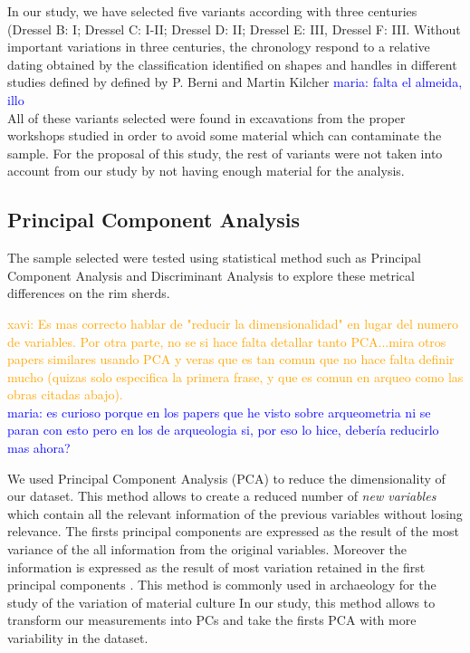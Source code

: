 \documentclass[review]{elsarticle}
\newcommand{\memo}[2]{\textcolor{#1}{#2}}
\newcommand{\xavi}[1]{\memo{orange}{xavi: #1\\}}
\newcommand{\maria}[1]{\memo{blue}{maria: #1\\}}
\begin{document}
In our study, we have selected five variants according with three centuries
(Dressel B: I; Dressel C: I-II; Dressel D: II; Dressel E: III, Dressel F: III. Without important variations in three centuries, the chronology respond to a relative dating obtained by the classification identified on shapes and handles in different studies defined by defined by P. Berni \citep{berni_millet_epigrafianforica_2008} and Martin Kilcher \citep{martin-kilcher_romischen_1994} \maria{falta el almeida, illo}All of these variants selected were found in excavations from the proper workshops studied in order to avoid some material which can contaminate the sample. For the proposal of this study, the rest of variants were not taken into account from our study by not having enough material for the analysis. 


\subsection{Principal Component Analysis}

The sample selected were tested using statistical method such as Principal Component Analysis and Discriminant Analysis to explore these metrical differences on the rim sherds. 

\xavi{Es mas correcto hablar de "reducir la dimensionalidad" en lugar del numero de variables. Por otra parte, no se si hace falta detallar tanto PCA...mira otros papers similares usando PCA y veras que es tan comun que no hace falta definir mucho (quizas solo especifica la primera frase, y que es comun en arqueo como las obras citadas abajo).}
\maria{es curioso porque en los papers que he visto sobre arqueometria ni se paran con esto pero en los de arqueologia si, por eso lo hice, debería reducirlo mas ahora?}

We used Principal Component Analysis (PCA) to reduce the dimensionality of our dataset. This method allows to create a reduced number of \textit{new variables} which contain all the relevant information of the previous variables without losing relevance. The firsts principal components are expressed as the result of the most variance of the all information from the original variables. Moreover the information is expressed as the result of most variation retained in the first principal components \citep{jolliffe_principal_2002, shennan_quantifying_1997}. 
This method is commonly used in archaeology for the study of the variation of material culture \citep{li_crossbows_2014, schillinger_differences_2016} 
In our study, this method allows to transform our measurements into PCs and take the firsts PCA with more variability in the dataset.  
\end{document}
